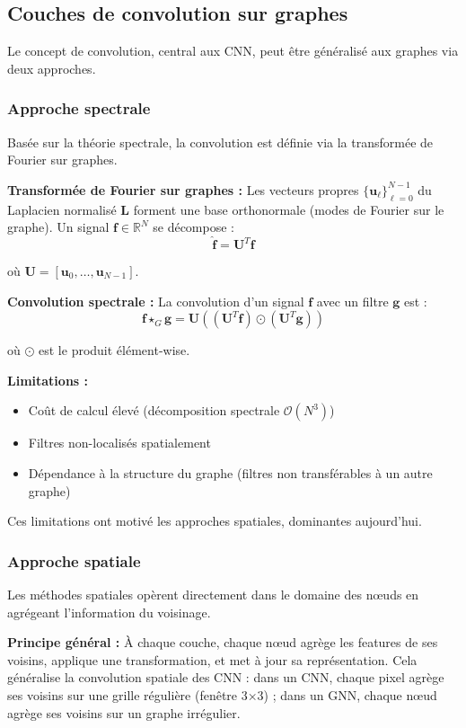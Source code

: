 \subsection{Couches de convolution sur graphes}

Le concept de convolution, central aux CNN, peut être généralisé aux graphes via deux approches.

\subsubsection{Approche spectrale}

Basée sur la théorie spectrale, la convolution est définie via la transformée de Fourier sur graphes.

\textbf{Transformée de Fourier sur graphes :}
Les vecteurs propres $\{\mathbf{u}_\ell\}_{\ell=0}^{N-1}$ du Laplacien normalisé $\mathbf{L}$ forment une base orthonormale (modes de Fourier sur le graphe). Un signal $\mathbf{f} \in \mathbb{R}^N$ se décompose :
\[
\hat{\mathbf{f}} = \mathbf{U}^T \mathbf{f}
\]

où $\mathbf{U} = [\mathbf{u}_0, \ldots, \mathbf{u}_{N-1}]$.

\textbf{Convolution spectrale :}
La convolution d'un signal $\mathbf{f}$ avec un filtre $\mathbf{g}$ est :
\[
\mathbf{f} \star_G \mathbf{g} = \mathbf{U} \left((\mathbf{U}^T \mathbf{f}) \odot (\mathbf{U}^T \mathbf{g})\right)
\]

où $\odot$ est le produit élément-wise.

\textbf{Limitations :}
\begin{itemize}
    \item Coût de calcul élevé (décomposition spectrale $\mathcal{O}(N^3)$)
    \item Filtres non-localisés spatialement
    \item Dépendance à la structure du graphe (filtres non transférables à un autre graphe)
\end{itemize}

Ces limitations ont motivé les approches spatiales, dominantes aujourd'hui.

\subsubsection{Approche spatiale}

Les méthodes spatiales opèrent directement dans le domaine des nœuds en agrégeant l'information du voisinage.

\textbf{Principe général :}
À chaque couche, chaque nœud agrège les features de ses voisins, applique une transformation, et met à jour sa représentation. Cela généralise la convolution spatiale des CNN : dans un CNN, chaque pixel agrège ses voisins sur une grille régulière (fenêtre 3×3) ; dans un GNN, chaque nœud agrège ses voisins sur un graphe irrégulier.


